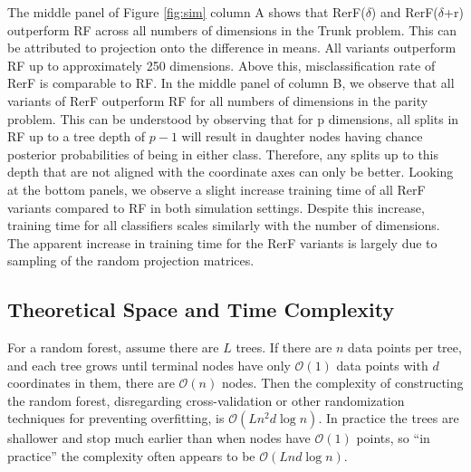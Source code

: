 \documentclass{article} %
\providecommand{\mc}[1]{\mathcal{#1}}
\begin{document}


The middle panel of Figure \ref{fig:sim} column A shows that RerF($\delta$) and RerF($\delta$+r) outperform RF across all numbers of dimensions in the Trunk problem. This can be attributed to projection onto the difference in means. All variants outperform RF up to approximately 250 dimensions. Above this, misclassification rate of RerF is comparable to RF. In the middle panel of column B, we observe that all variants of RerF outperform RF for all numbers of dimensions in the parity problem. This can be understood by observing that for p dimensions, all splits in RF up to a tree depth of $p - 1$ will result in daughter nodes having chance posterior probabilities of being in either class. Therefore, any splits up to this depth that are not aligned with the coordinate axes can only be better. Looking at the bottom panels, we observe a slight increase training time of all RerF variants compared to RF in both simulation settings. Despite this increase, training time for all classifiers scales similarly with the number of dimensions. The apparent increase in training time for the RerF variants is largely due to sampling of the random projection matrices. 

\subsection{Theoretical Space and Time Complexity}

For a random forest, assume there are $L$ trees.  
If there are $n$ data points per tree, and each tree grows until terminal nodes have only $\mc O(1)$ data points with $d$ coordinates in them, there are $\mc O(n)$ nodes.
Then the complexity of constructing the random forest, disregarding cross-validation or other randomization techniques for preventing overfitting, is $\mc O(Ln^2d\log n)$. In practice the trees are shallower and stop much earlier than when nodes have $\mc O(1)$ points, so ``in practice'' the complexity often appears to be $\mc O(Lnd\log n)$.
\end{document}
